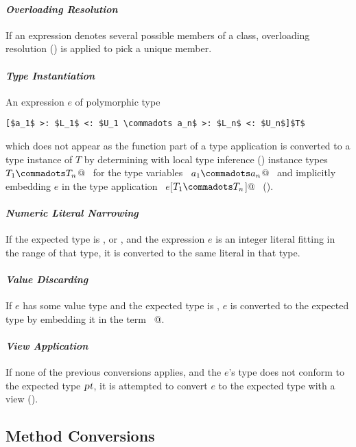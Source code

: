 \paragraph{\em Overloading Resolution} 
If an expression denotes several possible members of a class, 
overloading resolution ()
is applied to pick a unique member.

\paragraph{\em Type Instantiation}  
An expression $e$ of polymorphic type
\begin{lstlisting}
[$a_1$ >: $L_1$ <: $U_1 \commadots a_n$ >: $L_n$ <: $U_n$]$T$
\end{lstlisting}
which does not appear as the function part of
a type application is converted to a type instance of $T$
by determining with local type inference
() instance types ~\lstinline@$T_1 \commadots T_n$@~ 
for the type variables ~\lstinline@$a_1 \commadots a_n$@~ and
implicitly embedding $e$ in the type application
~\lstinline@$e$[$T_1 \commadots T_n$]@~ ().

\paragraph{\em Numeric Literal Narrowing}
If the expected type is ,  or , and
the expression $e$ is an integer literal fitting in the range of that
type, it is converted to the same literal in that type.

\paragraph{\em Value Discarding}
If $e$ has some value type and the expected type is ,
$e$ is converted to the expected type by embedding it in the 
term ~@.

\paragraph{\em View Application}
If none of the previous conversions applies, and the $e$'s type
does not conform to the expected type $\mbox{\sl pt}$, it is attempted to convert
$e$ to the expected type with a view ().\bigskip

\subsection{Method Conversions}

